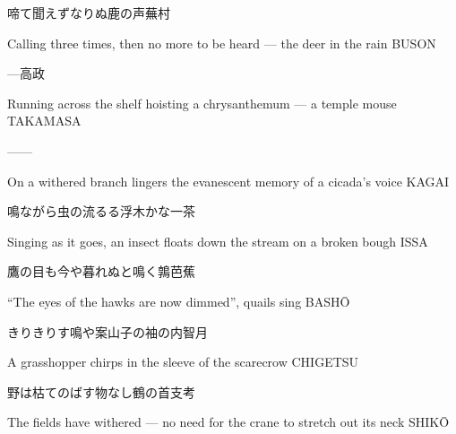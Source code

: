 \begin{haiku}
    {\FH {}啼て聞えずなりぬ鹿の声}\hfill{\FH 蕪村}

    \vin{} Calling three times,
    \vin{} \vin{} then no more to be heard ---
    \vin{} \vin{} \vin{} the deer in the rain \hspace{\fill} BUSON
\end{haiku}

\begin{haiku}
    {---}\hfill{\FH 高政}

    \vin{} Running across the shelf
    \vin{} \vin{} hoisting a chrysanthemum ---
    \vin{} \vin{} \vin{} a temple mouse \hspace{\fill} TAKAMASA
\end{haiku}

\begin{haiku}
    ---\hfill{---}

    \vin{} On a withered branch
    \vin{} \vin{} lingers the evanescent memory
    \vin{} \vin{} \vin{} of a cicada's voice \hspace{\fill} KAGAI
\end{haiku}

\begin{haiku}
    {\FH 鳴ながら虫の流るる浮木かな}\hfill{\FH 一茶}

    \vin{} Singing as it goes,
    \vin{} \vin{} an insect floats down the stream
    \vin{} \vin{} \vin{} on a broken bough \hspace{\fill} ISSA
\end{haiku}

\begin{haiku}
    {\FH 鷹の目も今や暮れぬと鳴く鶉}\hfill{\FH 芭蕉}

    \vin{} ``The eyes of the hawks
    \vin{} \vin{} are now dimmed'',
    \vin{} \vin{} \vin{} quails sing \hspace{\fill} BASH\={O}
\end{haiku}

\begin{haiku}
    {\FH きりきりす鳴や案山子の袖の内}\hfill{\FH 智月}

    \vin{} A grasshopper
    \vin{} \vin{} chirps in the sleeve
    \vin{} \vin{} \vin{} of the scarecrow \hspace{\fill} CHIGETSU
\end{haiku}

\begin{haiku}
    {\FH 野は枯てのばす物なし鶴の首}\hfill{\FH 支考}

    \vin{} The fields have withered ---
    \vin{} \vin{} no need for the crane
    \vin{} \vin{} \vin{} to stretch out its neck \hspace{\fill} SHIK\={O}
\end{haiku}


